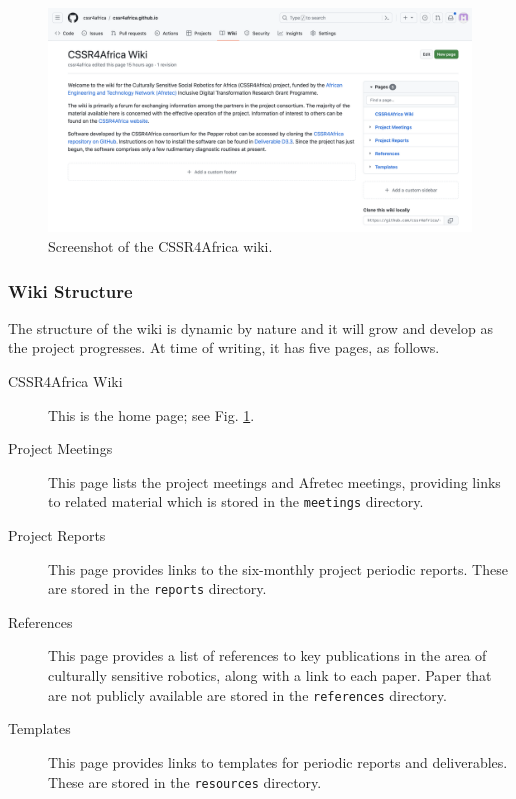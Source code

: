 \documentclass{CSSRforAfrica}
\begin{document}
\begin{figure}[tb]
\begin{center}
\includegraphics[width=160mm,angle=0]{./images/CSSR4Africa_wiki.png} 
\end{center}
\vspace{-5mm}
\caption{Screenshot of the CSSR4Africa wiki.}          
\label{fig:wiki}                                                                
\end{figure}

\subsubsection{Wiki Structure}

The structure of the wiki is dynamic by nature and it will grow and develop as the project progresses.  
At time of writing, it has five pages, as follows.
\begin{description}

\item[CSSR4Africa Wiki] This is the home page; see Fig. \ref{fig:wiki}.

\item[Project Meetings] This page lists the project meetings and  Afretec meetings, providing links to related material which is stored in the {\small \texttt{meetings}} directory.

\item[Project Reports] This page provides links to the six-monthly project periodic reports.  These  are stored in the {\small \texttt{reports}} directory.

\item[References] This page provides a list of  references to key publications in the area of culturally sensitive robotics, along with a  link to each paper.  Paper that are not publicly available are stored in the {\small \texttt{references}} directory.

\item[Templates] This page provides links to templates for periodic reports and deliverables.  These  are stored in the {\small \texttt{resources}} directory.

\end{description}
\end{document}
